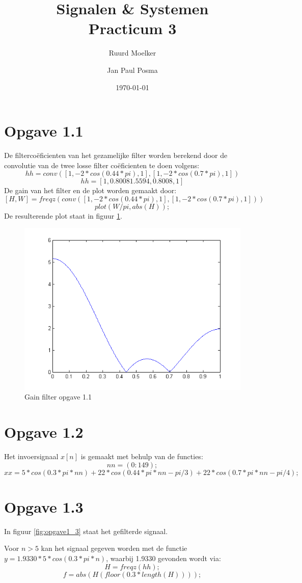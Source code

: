 \documentclass{article}
\author{Ruurd Moelker \and Jan Paul Posma}
\date{\today}
\title{Signalen \& Systemen \\Practicum 3}
\begin{document}
\maketitle
 
\section{Opgave 1.1}
De filterco\"eficienten van het gezamelijke filter worden berekend door de convolutie van de twee losse filter co\"eficienten te doen volgens:
$$hh = conv([1, -2*cos(0.44*pi), 1], [1, -2*cos(0.7*pi), 1])$$
$$hh = [1, 0.8008 1.5594, 0.8008, 1]$$
De gain van het filter en de plot worden gemaakt door:
$$[H, W] = freqz( conv([1, -2*cos(0.44*pi), 1], [1, -2*cos(0.7*pi), 1]) )$$
$$plot(W/pi, abs(H));$$
De resulterende plot staat in figuur \ref{fig:opgave1_1}.

\begin{figure}[h]
	\includegraphics[width=.8\textwidth]{content/1_1.png}
	\caption{Gain filter opgave 1.1}
	\label{fig:opgave1_1}
\end{figure}

\newpage
\section{Opgave 1.2}
Het invoersignaal $x[n]$ is gemaakt met behulp van de functies:
$$nn = (0:149);$$
$$xx = 5*cos(0.3*pi*nn) + 22 * cos(0.44*pi*nn - pi/3) + 22 * cos (0.7*pi*nn - pi/4);$$


\section{Opgave 1.3}
In figuur \ref{fig:opgave1_3} staat het gefilterde signaal.

Voor $n>5$ kan het signaal gegeven worden met de functie $y = 1.9330 * 5*cos(0.3*pi*n)$, waarbij 1.9330 gevonden wordt via:
$$H = freqz(hh);$$
$$f = abs(H(floor(0.3*length(H))));$$
\end{document}
